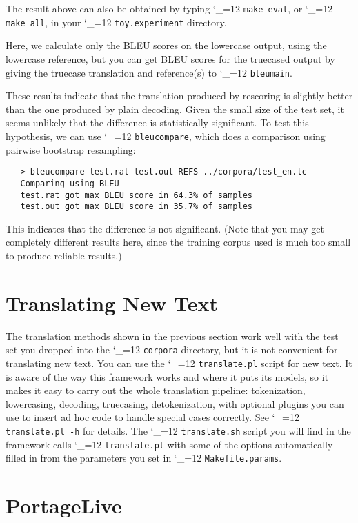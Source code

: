 \documentclass[11pt,letterpaper]{article}
\def\code{\begingroup\catcode`\_=12 \codex}
\newcommand{\codex}[1]{\texttt{#1}\endgroup}
\begin{document}
The result above can also be obtained by typing \code{make eval}, or
\code{make all}, in your \code{toy.experiment} directory.

Here, we calculate only the BLEU scores on the lowercase output, using the
lowercase reference, but you can get BLEU scores for the truecased output by
giving the truecase translation and reference(s) to \code{bleumain}.

These results indicate that the translation produced by rescoring is slightly
better than the one produced by plain decoding. Given the small size of the
test set, it seems unlikely that the difference is statistically
significant. To test this hypothesis, we can use \code{bleucompare}, which does
a comparison using pairwise bootstrap resampling:
\begin{small}
\begin{verbatim}
   > bleucompare test.rat test.out REFS ../corpora/test_en.lc 
   Comparing using BLEU
   test.rat got max BLEU score in 64.3% of samples
   test.out got max BLEU score in 35.7% of samples
\end{verbatim}
\end{small}
This indicates that the difference is not significant.  (Note that you may get
completely different results here, since the training corpus used is much too
small to produce reliable results.)

\section{Translating New Text}

The translation methods shown in the previous section work well with the test
set you dropped into the \code{corpora} directory, but it is not convenient for
translating new text.  You can use the \code{translate.pl} script for new text.
It is aware of the way this framework works and where it puts its models, so it
makes it easy to carry out the whole translation pipeline: tokenization,
lowercasing, decoding, truecasing, detokenization, with optional plugins you
can use to insert ad hoc code to handle special cases correctly.  See
\code{translate.pl -h} for details.  The \code{translate.sh} script you will
find in the framework calls \code{translate.pl} with some of the options
automatically filled in from the parameters you set in \code{Makefile.params}.

\section{PortageLive}
\end{document}
